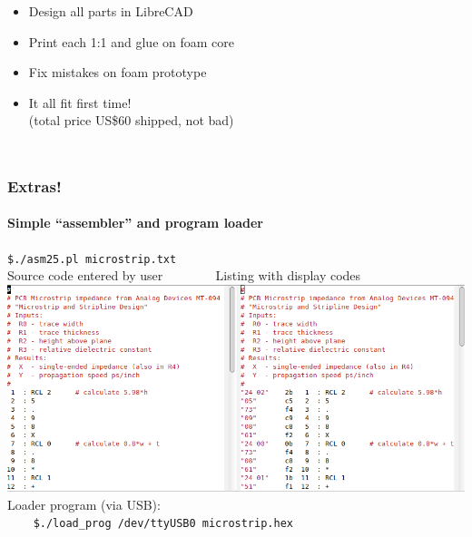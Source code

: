 \documentclass{beamer}
\newcommand{\tred}[1]{\textcolor{my-red}{#1}}
\newcommand{\tgreen}[1]{\textcolor{my-green}{#1}}
\newcommand{\tblue}[1]{\textcolor{my-blue}{#1}}
\begin{document}
\begin{frame}
\begin{columns}
    \vskip 0.2in
      \begin{itemize}
      \scriptsize
      \item Design all parts in LibreCAD
      \item Print each 1:1 and glue on foam core
      \item Fix mistakes on foam prototype
      \item \tgreen{It all fit first time!} \\
        \tblue{(total price US\$60 shipped, not bad)}
      \end{itemize}
  \end{columns}
  


\end{frame}

\begin{frame}
  \frametitle{Extras!}
  \framesubtitle{Simple ``assembler'' and program loader}
  \vskip -0.3in
  \tred{\scriptsize \tt \$./asm25.pl microstrip.txt} \\
  Source code entered by user ~~~~~~~ Listing with display codes \\
  \includegraphics[width=\textwidth]{figs/microstrip-list.png} \\
  \vskip 0.1in
  \scriptsize
  \tblue{Loader program (via USB):}\\
  \tred{\tt ~~~ \$./load\_prog /dev/ttyUSB0 microstrip.hex}
\end{frame}
\end{document}
